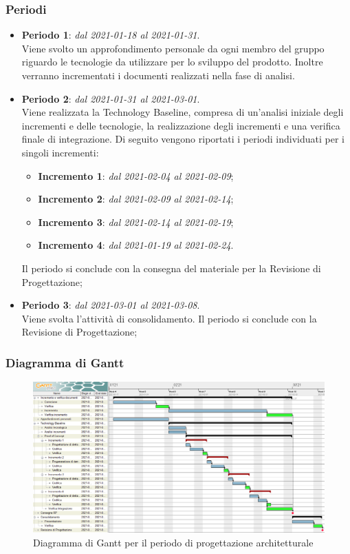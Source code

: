 \subsubsection{Periodi}

\begin{itemize}
\item \textbf{Periodo 1}: \textit{dal 2021-01-18 al 2021-01-31}. \\
Viene svolto un approfondimento personale da ogni membro del gruppo riguardo le tecnologie da utilizzare per lo sviluppo del prodotto. Inoltre verranno incrementati i documenti realizzati nella fase di analisi.
\item \textbf{Periodo 2}: \textit{dal 2021-01-31 al 2021-03-01}. \\
Viene realizzata la Technology Baseline, compresa di un'analisi iniziale degli incrementi e delle tecnologie, la realizzazione degli incrementi e una verifica finale di integrazione. Di seguito vengono riportati i periodi individuati per i singoli incrementi:
\begin{itemize}
\item \textbf{Incremento 1}: \textit{dal 2021-02-04 al 2021-02-09};
\item \textbf{Incremento 2}: \textit{dal 2021-02-09 al 2021-02-14};
\item \textbf{Incremento 3}: \textit{dal 2021-02-14 al 2021-02-19};
\item \textbf{Incremento 4}: \textit{dal 2021-01-19 al 2021-02-24}.
\end{itemize}
Il periodo si conclude con la consegna del materiale per la Revisione di Progettazione;
\item \textbf{Periodo 3}: \textit{dal 2021-03-01 al 2021-03-08}. \\
Viene svolta l'attività di consolidamento. Il periodo si conclude con la Revisione di Progettazione;
\end{itemize}


\subsubsection{Diagramma di Gantt}

\begin{figure}[H]
\centering

\centerline{\includegraphics[scale=0.5]{res/Pianificazione/Gantt/progettazione}}
\caption{Diagramma di Gantt per il periodo di progettazione architetturale}
\end{figure}

